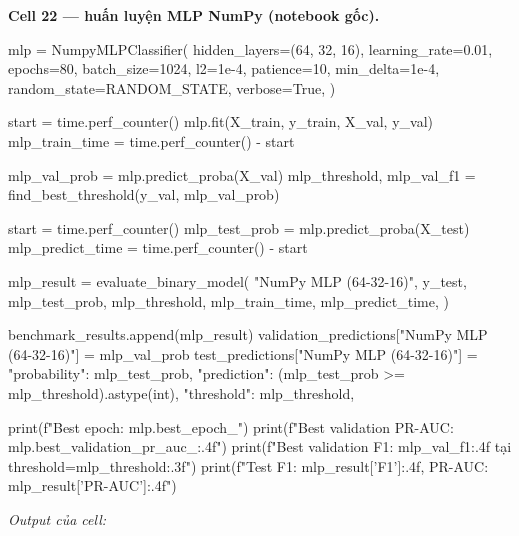\documentclass[12pt,a4paper]{report}
\begin{document}
\par\medskip\noindent\textbf{Cell 22 --- huấn luyện MLP NumPy (notebook gốc).}
\begin{NotebookCode}
mlp = NumpyMLPClassifier(
    hidden_layers=(64, 32, 16),
    learning_rate=0.01,
    epochs=80,
    batch_size=1024,
    l2=1e-4,
    patience=10,
    min_delta=1e-4,
    random_state=RANDOM_STATE,
    verbose=True,
)

start = time.perf_counter()
mlp.fit(X_train, y_train, X_val, y_val)
mlp_train_time = time.perf_counter() - start

mlp_val_prob = mlp.predict_proba(X_val)
mlp_threshold, mlp_val_f1 = find_best_threshold(y_val, mlp_val_prob)

start = time.perf_counter()
mlp_test_prob = mlp.predict_proba(X_test)
mlp_predict_time = time.perf_counter() - start

mlp_result = evaluate_binary_model(
    "NumPy MLP (64-32-16)",
    y_test,
    mlp_test_prob,
    mlp_threshold,
    mlp_train_time,
    mlp_predict_time,
)

benchmark_results.append(mlp_result)
validation_predictions["NumPy MLP (64-32-16)"] = mlp_val_prob
test_predictions["NumPy MLP (64-32-16)"] = {
    "probability": mlp_test_prob,
    "prediction": (mlp_test_prob >= mlp_threshold).astype(int),
    "threshold": mlp_threshold,
}

print(f"Best epoch: {mlp.best_epoch_}")
print(f"Best validation PR-AUC: {mlp.best_validation_pr_auc_:.4f}")
print(f"Best validation F1: {mlp_val_f1:.4f} tại threshold={mlp_threshold:.3f}")
print(f"Test F1: {mlp_result['F1']:.4f}, PR-AUC: {mlp_result['PR-AUC']:.4f}")
\end{NotebookCode}
\noindent\textit{Output của cell:}
\end{document}
